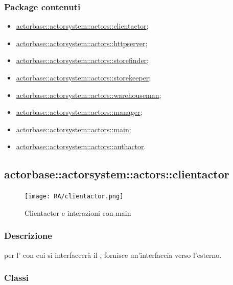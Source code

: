 \documentclass{scalatekids-article}
\begin{document}
\subsubsection{Package contenuti}
\begin{itemize}
\item \hyperref[sec:actorbase::actorsystem::actors::clientactor]{actorbase::actorsystem::actors::clientactor};
\item \hyperref[sec:actorbase::actorsystem::actors::httpserver]{actorbase::actorsystem::actors::httpserver};
\item \hyperref[sec:actorbase::actorsystem::actors::storefinder]{actorbase::actorsystem::actors::storefinder};
\item \hyperref[sec:actorbase::actorsystem::actors::storekeeper]{actorbase::actorsystem::actors::storekeeper};
\item \hyperref[sec:actorbase::actorsystem::actors::warehouseman]{actorbase::actorsystem::actors::warehouseman};
\item \hyperref[sec:actorbase::actorsystem::actors::manager]{actorbase::actorsystem::actors::manager};
\item \hyperref[sec:actorbase::actorsystem::actors::main]{actorbase::actorsystem::actors::main};
\item \hyperref[sec:actorbase::actorsystem::actors::authactor]{actorbase::actorsystem::actors::authactor}.
\end{itemize}

\subsection{actorbase::actorsystem::actors::clientactor}
\label{sec:actorbase::actorsystem::actors::clientactor}

\begin{figure}[H]
  \begin{center}
    \texttt{[image: RA/clientactor.png]}
    \caption{Clientactor e interazioni con main}
  \end{center}
\end{figure}

\subsubsection{Descrizione}

 per l' con cui si interfaccerà il ,
fornisce un'interfaccia  verso l'esterno.

\subsubsection{Classi}
\end{document}
